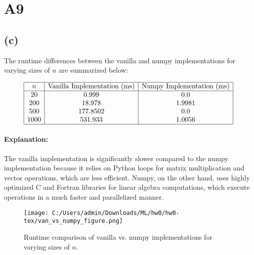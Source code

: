 \documentclass{article}
\begin{document}
\section*{A9}

\subsection*{(c)}

The runtime differences between the vanilla and numpy implementations for varying sizes of \(n\) are summarized below:

\[
\begin{array}{|c|c|c|}
\hline
n & \text{Vanilla Implementation (ms)} & \text{Numpy Implementation (ms)} \\
\hline
20   & 0.999   & 0.0 \\
200  & 18.978  & 1.9981 \\
500  & 177.8502 & 0.0 \\
1000 & 531.933 & 1.0056 \\
\hline
\end{array}
\]

\paragraph{Explanation:}
The vanilla implementation is significantly slower compared to the numpy implementation because it relies on Python loops for matrix multiplication and vector operations, which are less efficient. Numpy, on the other hand, uses highly optimized C and Fortran libraries for linear algebra computations, which execute operations in a much faster and parallelized manner.

\begin{figure}
    \centering
    \texttt{[image: C:/Users/admin/Downloads/ML/hw0/hw0-tex/van\_vs\_numpy\_figure.png]}
    \caption{Runtime comparison of vanilla vs. numpy implementations for varying sizes of \(n\).}
    \label{fig:van-vs-numpy}
\end{figure}
\end{document}
